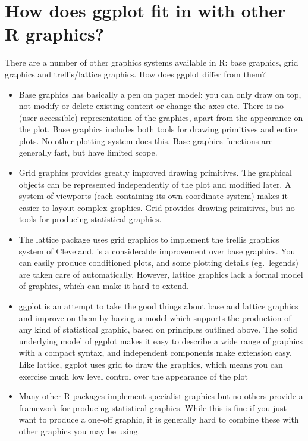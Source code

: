 \section{How does ggplot fit in with other R graphics?}

There are a number of other graphics systems available in R: base graphics, grid graphics and trellis/lattice graphics.  How does ggplot differ from them?

\begin{itemize} 
	\item Base graphics has basically a pen on paper model: you can only draw on top, not modify or delete existing content or change the axes etc.  There is no (user accessible) representation of the graphics, apart from the appearance on the plot. Base graphics includes both tools for drawing primitives and entire plots. No other plotting system does this.  Base graphics functions are generally fast, but have limited scope.

	\item Grid graphics provides greatly improved drawing primitives. The graphical objects can be represented independently of the plot and modified later. A system of viewports (each containing its own coordinate system) makes it easier to layout complex graphics.  Grid provides drawing primitives, but no tools for producing statistical graphics.

	\item The lattice package uses grid graphics to implement the trellis graphics system of Cleveland, is a considerable improvement over base graphics.  You can easily produce conditioned plots, and some plotting details (eg.\ legends) are taken care of automatically.  However, lattice graphics lack a formal model of graphics, which can make it hard to extend.

	\item ggplot is an attempt to take the good things about base and lattice graphics and improve on them by having a model which supports the production of any kind of statistical graphic, based on principles outlined above.  The solid underlying model of ggplot makes it easy to describe a wide range of graphics with a compact syntax, and independent components make extension easy.  Like lattice, ggplot uses grid to draw the graphics, which means you can exercise much low level control over the appearance of the plot

	\item Many other R packages implement specialist graphics but no others provide a framework for producing statistical graphics. While this is fine if you just want to produce a one-off graphic, it is generally hard to combine these with other graphics you may be using.

\end{itemize}

